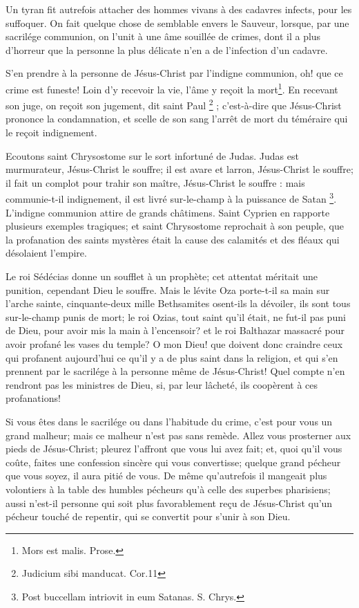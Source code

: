 \documentclass[instructions.tex]{subfiles}
\begin{document}
Un tyran fit autrefois attacher des hommes vivans à des cadavres infects, pour les suffoquer. On fait quelque chose de semblable envers le Sauveur, lorsque, par une sacrilége communion, on l’unit à une âme souillée de crimes, dont il a plus d’horreur que la personne la plus délicate n’en a de l’infection d’un cadavre.
 
S’en prendre à la personne de Jésus-Christ par l’indigne communion, oh! que ce crime est funeste! Loin d’y recevoir la vie, l’âme y reçoit la mort\footnote{Mors est malis. Prose.}. En recevant son juge, on reçoit son jugement, dit saint Paul \footnote{Judicium sibi manducat. Cor.11} ; c’est-à-dire que Jésus-Christ prononce la condamnation, et scelle de son sang l’arrêt de mort du téméraire qui le reçoit indignement.
 
Ecoutons saint Chrysostome sur le sort infortuné de Judas. Judas est murmurateur, Jésus-Christ le souffre; il est avare et larron, Jésus-Christ le souffre; il fait un complot pour trahir son maître, Jésus-Christ le souffre : mais communie-t-il indignement, il est livré sur-le-champ à la puissance de Satan \footnote{Post buccellam intriovit in eum Satanas. S. Chrys.}. L’indigne communion attire de grands châtimens. Saint Cyprien en rapporte plusieurs exemples tragiques; et saint Chrysostome reprochait à son peuple, que la profanation des saints mystères était la cause des calamités et des fléaux qui désolaient l’empire.
 
Le roi Sédécias donne un soufflet à un prophète; cet attentat méritait une punition, cependant Dieu le souffre. Mais le lévite Oza porte-t-il sa main sur l’arche sainte, cinquante-deux mille Bethsamites osent-ils la dévoiler, ils sont tous sur-le-champ punis de mort; le roi Ozias, tout saint qu’il était, ne fut-il pas puni de Dieu, pour avoir mis la main à l’encensoir? et le roi Balthazar massacré pour avoir profané les vases du temple? O mon Dieu! que doivent donc craindre ceux qui profanent aujourd’hui ce qu’il y a de plus saint dans la religion, et qui s’en prennent par le sacrilége à la personne même de Jésus-Christ! Quel compte n’en rendront pas les ministres de Dieu, si, par leur lâcheté, ils coopèrent à ces profanations!
 
Si vous êtes dans le sacrilége ou dans l’habitude du crime, c’est pour vous un grand malheur; mais ce malheur n’est pas sans remède. Allez vous prosterner aux pieds de Jésus-Christ; pleurez l’affront que vous lui avez fait; et, quoi qu’il vous coûte, faites une confession sincère qui vous convertisse; quelque grand pécheur que vous soyez, il aura pitié de vous. De même qu’autrefois il mangeait plus volontiers à la table des humbles pécheurs qu’à celle des superbes pharisiens; aussi n’est-il personne qui soit plus favorablement reçu de Jésus-Christ qu’un pécheur touché de repentir, qui se convertit pour s’unir à son Dieu.
 
\end{document}
